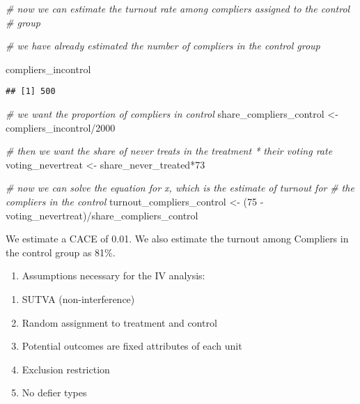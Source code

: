 \documentclass[
]{article}
\newenvironment{Shaded}{\begin{snugshade}}{\end{snugshade}}
\newcommand{\CommentTok}[1]{\textcolor[rgb]{0.56,0.35,0.01}{\textit{#1}}}
\newcommand{\DecValTok}[1]{\textcolor[rgb]{0.00,0.00,0.81}{#1}}
\newcommand{\NormalTok}[1]{#1}
\newcommand{\OtherTok}[1]{\textcolor[rgb]{0.56,0.35,0.01}{#1}}
\newcommand{\SpecialCharTok}[1]{\textcolor[rgb]{0.00,0.00,0.00}{#1}}
\providecommand{\tightlist}{%
  \setlength{\itemsep}{0pt}\setlength{\parskip}{0pt}}
\begin{document}
\begin{Shaded}
\begin{Highlighting}[]
\CommentTok{\# now we can estimate the turnout rate among compliers assigned to the control}
\CommentTok{\# group}

\CommentTok{\# we have already estimated the number of compliers in the control group}

\NormalTok{compliers\_incontrol}
\end{Highlighting}
\end{Shaded}

\begin{verbatim}
## [1] 500
\end{verbatim}

\begin{Shaded}
\begin{Highlighting}[]
\CommentTok{\# we want the proportion of compliers in control}
\NormalTok{share\_compliers\_control }\OtherTok{\textless{}{-}}\NormalTok{ compliers\_incontrol}\SpecialCharTok{/}\DecValTok{2000}

\CommentTok{\# then we want the share of never treats in the treatment * their voting rate}
\NormalTok{voting\_nevertreat }\OtherTok{\textless{}{-}}\NormalTok{ share\_never\_treated}\SpecialCharTok{*}\DecValTok{73}

\CommentTok{\# now we can solve the equation for x, which is the estimate of turnout for }
\CommentTok{\# the compliers in the control}
\NormalTok{turnout\_compliers\_control }\OtherTok{\textless{}{-}}\NormalTok{ (}\DecValTok{75} \SpecialCharTok{{-}}\NormalTok{ voting\_nevertreat)}\SpecialCharTok{/}\NormalTok{share\_compliers\_control}
\end{Highlighting}
\end{Shaded}

We estimate a CACE of 0.01. We also estimate the turnout among Compliers
in the control group as 81\%.

\begin{enumerate}
\def\labelenumi{(\alph{enumi})}
\setcounter{enumi}{4}
\tightlist
\item
  Assumptions necessary for the IV analysis:
\end{enumerate}

\begin{enumerate}
\def\labelenumi{\arabic{enumi})}
\tightlist
\item
  SUTVA (non-interference)
\item
  Random assignment to treatment and control
\item
  Potential outcomes are fixed attributes of each unit
\item
  Exclusion restriction
\item
  No defier types
\end{enumerate}
\end{document}
